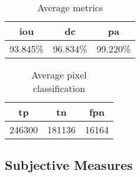 \begin{minipage}[c]{0.475\textwidth}
\begin{table}[H]
    \centering
    \begin{tabular}{||c c c||} 
        \hline
        \acrshort{iou} & \acrshort{dc} & \acrshort{pa} \\ [0.5ex] 
        \hline\hline
        93.845\% & 96.834\% & 99.220\% \\ [1ex] 
        \hline
    \end{tabular}
    \caption{Average metrics}
    \label{tab:metrics_video_12}
\end{table}
\end{minipage}
\begin{minipage}[c]{0.475\textwidth}
\begin{table}[H]
    \centering
    \begin{tabular}{||c c c||} 
        \hline
        \acrshort{tp} & \acrshort{tn} & \acrshort{fpn} \\ [0.5ex] 
        \hline\hline
        246300 & 181136 & 16164 \\ [1ex] 
        \hline
    \end{tabular}
    \caption{Average pixel classification}
    \label{tab:pixels_video_12}
\end{table}
\end{minipage}

\subsection{Subjective Measures}